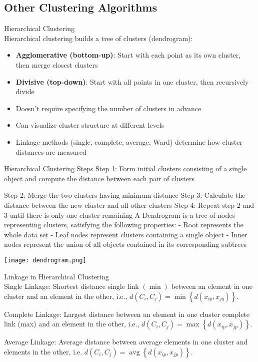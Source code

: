 \subsection{Other Clustering Algorithms}

\begin{concept}{Hierarchical Clustering}\\
Hierarchical clustering builds a tree of clusters (dendrogram):
\begin{itemize}
    \item \textbf{Agglomerative (bottom-up)}: Start with each point as its own cluster, then merge closest clusters
    \item \textbf{Divisive (top-down)}: Start with all points in one cluster, then recursively divide
    \item Doesn't require specifying the number of clusters in advance
    \item Can visualize cluster structure at different levels
    \item Linkage methods (single, complete, average, Ward) determine how cluster distances are measured
\end{itemize}
\end{concept}

\begin{KR}{Hierarchical Clustering Steps}
    Step 1: Form initial clusters consisting of a single object and compute the distance between each pair of clusters

Step 2: Merge the two clusters having minimum distance
Step 3: Calculate the distance between the new cluster and all other clusters
Step 4: Repeat step 2 and 3 until there is only one cluster remaining
A Dendrogram is a tree of nodes representing clusters, satisfying the following properties:
- Root represents the whole data set
- Leaf nodes represent clusters containing a single object
- Inner nodes represent the union of all objects contained in its corresponding subtrees

\texttt{[image: dendrogram.png]}
\end{KR}

\begin{theorem}{Linkage in Hierarchical Clustering}\\
    Single Linkage: Shortest distance single link $(\min )$ between an element in one cluster and an element in the other, i.e., $d\left(C_i, C_j\right)=\min \left\{d\left(x_{i p}, x_{j q}\right)\right\}$.

Complete Linkage: Largest distance between an element in one cluster complete link (max) and an element in the other, i.e., $d\left(C_i, C_j\right)=\max \left\{d\left(x_{i p}, x_{j p}\right)\right\}$.

Average Linkage: Average distance between average elements in one cluster and elements in the other, i.e. $d\left(C_i, C_j\right)=\operatorname{avg}\left\{d\left(x_{i p}, x_{j p}\right)\right\}$.

\end{theorem}

